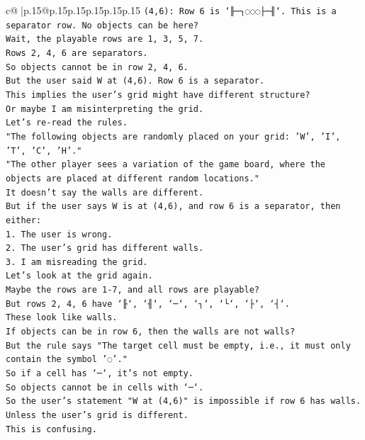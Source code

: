 \documentclass{article}
\begin{document}
{\begin{supertabular}{c@{$\;$}|p{.15\linewidth}@{}p{.15\linewidth}p{.15\linewidth}p{.15\linewidth}p{.15\linewidth}p{.15\linewidth}}
{{{\texttt{(4,6): Row 6 is `╟─┐◌◌◌├─╢`. This is a separator row. No objects can be here?} \\
\texttt{Wait, the playable rows are 1, 3, 5, 7.} \\
\texttt{Rows 2, 4, 6 are separators.} \\
\texttt{So objects cannot be in row 2, 4, 6.} \\
\texttt{But the user said W at (4,6). Row 6 is a separator.} \\
\texttt{This implies the user's grid might have different structure?} \\
\texttt{Or maybe I am misinterpreting the grid.} \\
\texttt{Let's re{-}read the rules.} \\
\texttt{"The following objects are randomly placed on your grid: 'W', 'I', 'T', 'C', 'H'."} \\
\texttt{"The other player sees a variation of the game board, where the objects are placed at different random locations."} \\
\texttt{It doesn't say the walls are different.} \\
\texttt{But if the user says W is at (4,6), and row 6 is a separator, then either:} \\
\texttt{1. The user is wrong.} \\
\texttt{2. The user's grid has different walls.} \\
\texttt{3. I am misreading the grid.} \\
\texttt{Let's look at the grid again.} \\
\texttt{Maybe the rows are 1{-}7, and all rows are playable?} \\
\texttt{But rows 2, 4, 6 have `╟`, `╢`, `─`, `┐`, `└`, `├`, `┤`.} \\
\texttt{These look like walls.} \\
\texttt{If objects can be in row 6, then the walls are not walls?} \\
\texttt{But the rule says "The target cell must be empty, i.e., it must only contain the symbol '◌'."} \\
\texttt{So if a cell has `─`, it's not empty.} \\
\texttt{So objects cannot be in cells with `─`.} \\
\texttt{So the user's statement "W at (4,6)" is impossible if row 6 has walls.} \\
\texttt{Unless the user's grid is different.} \\
\texttt{This is confusing.} \\
}}}
\end{supertabular}}
\end{document}
